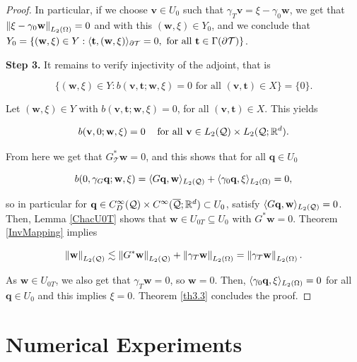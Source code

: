 \begin{proof}
    In particular, if we choose $\mathbf{v}\in U_0$ such that $\gamma_T\mathbf{v}=\xi-\gamma_0\mathbf{w}$, we get that $\left\lVert\xi-\gamma_0\mathbf{w} \right\rVert_{L_2(\Omega)}=0$ and with this $(\mathbf{w},\xi)\in Y_0$, and we conclude that $Y_0=\{(\mathbf{w},\xi)\in Y: \langle \mathbf{t} , (\mathbf{w},\xi) \rangle_{\partial\mathcal{T}}=0, \text{ for all }\mathbf{t}\in\Gamma(\partial\mathcal{T})\}$. 

    \vspace{0.3 cm}

    \textbf{Step 3.} It remains to verify injectivity of the adjoint, that is

    $$\{(\mathbf{w},\xi)\in Y: b(\mathbf{v},\mathbf{t};\mathbf{w},\xi)=0 \text{ for all }(\mathbf{v},\mathbf{t})\in X\}=\{0\}.$$

    Let $(\mathbf{w},\xi)\in Y$ with $b(\mathbf{v},\mathbf{t};\mathbf{w},\xi)=0$, for all $(\mathbf{v},\mathbf{t})\in X$. This yields

    $$b(\mathbf{v},0;\mathbf{w},\xi)=0 \hspace{0.3 cm}\text{ for all }\mathbf{v}\in L_2(\mathcal{Q})\times L_2(\mathcal{Q};\mathbb{R}^d).$$

    From here we get that $G^*_{\mathcal{T}}\mathbf{w}=0$, and this shows that for all $\mathbf{q}\in U_0$

    $$b(0,\gamma_G\mathbf{q};\mathbf{w},\xi)=\langle G\mathbf{q} , \mathbf{w} \rangle_{L_2(\mathcal{Q})}+\langle \gamma_0\mathbf{q} , \xi \rangle_{L_2(\Omega)}=0,$$

    so in particular for $\mathbf{q}\in C_D^\infty(\mathcal{Q})\times C^\infty(\overline{\mathcal{Q}};\mathbb{R}^d)\subset U_0$, satisfy $\langle G\mathbf{q} , \mathbf{w} \rangle_{L_2(\mathcal{Q})}=0$. Then, Lemma \ref{ChacU0T} shows that $\mathbf{w}\in U_{0T}\subseteq U_0$ with $G^*\mathbf{w}=0$. Theorem \ref{InvMapping} implies

    $$\left\lVert\mathbf{w} \right\rVert_{L_2(\mathcal{Q})}\lesssim \left\lVert G^*\mathbf{w} \right\rVert_{L_2(\mathcal{Q})}+\left\lVert\gamma_T\mathbf{w} \right\rVert_{L_2(\Omega)}=\left\lVert\gamma_T\mathbf{w} \right\rVert_{L_2(\Omega)}.$$ 
    
    As $\mathbf{w}\in U_{0T}$, we also get that $\gamma_T\mathbf{w}=0$, so $\mathbf{w}=0$. Then, $\langle \gamma_0\mathbf{q} , \xi \rangle_{L_2(\Omega)}=0$ for all $\mathbf{q}\in U_0$ and this implies $\xi=0$. Theorem \ref{th3.3} concludes the proof.
\end{proof}

    \newpage

\section{Numerical Experiments}

